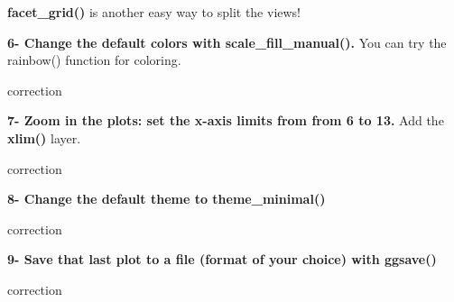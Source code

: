 \documentclass[]{book}
\begin{document}
\textbf{facet\_grid()} is another easy way to split the views!

\textbf{6- Change the default colors with scale\_fill\_manual().}
You can try the rainbow() function for coloring.

correction

\textbf{7- Zoom in the plots: set the x-axis limits from from 6 to 13.}
Add the \textbf{xlim()} layer.

correction

\textbf{8- Change the default theme to theme\_minimal()}

correction

\textbf{9- Save that last plot to a file (format of your choice) with ggsave()}

correction


\end{document}
